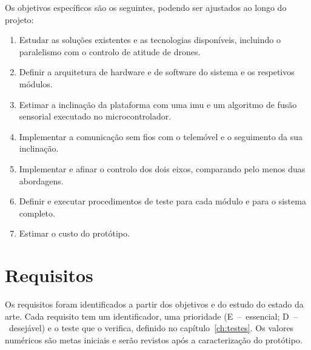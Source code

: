 Os objetivos específicos são os seguintes, podendo ser ajustados ao longo do projeto:
\begin{enumerate}[label=OE\arabic*.]
\item Estudar as soluções existentes e as tecnologias disponíveis, incluindo o paralelismo com o controlo de atitude de drones.
\item Definir a arquitetura de hardware e de software do sistema e os respetivos módulos.
\item Estimar a inclinação da plataforma com uma \gls{imu} e um algoritmo de fusão sensorial executado no microcontrolador.
\item Implementar a comunicação sem fios com o telemóvel e o seguimento da sua inclinação.
\item Implementar e afinar o controlo dos dois eixos, comparando pelo menos duas abordagens.
\item Definir e executar procedimentos de teste para cada módulo e para o sistema completo.
\item Estimar o custo do protótipo.
\end{enumerate}

\section{Requisitos}
Os requisitos foram identificados a partir dos objetivos e do estudo do estado da arte. Cada requisito tem um identificador, uma prioridade (E~--~essencial; D~--~desejável) e o teste que o verifica, definido no capítulo~\ref{ch:testes}. Os valores numéricos são metas iniciais e serão revistos após a caracterização do protótipo.

